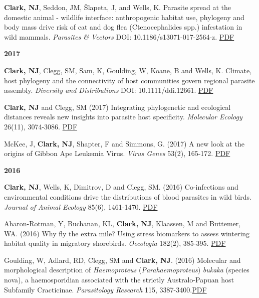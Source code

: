 \documentclass[]{article}
\begin{document}
\textbf{Clark, NJ}, Seddon, JM, Šlapeta, J, and Wells, K. Parasite
spread at the domestic animal - wildlife interface: anthropogenic
habitat use, phylogeny and body mass drive risk of cat and dog flea
(Ctenocephalides spp.) infestation in wild mammals. \emph{Parasites \&
Vectors} DOI: 10.1186/s13071-017-2564-z.
\href{http://nicholasjclark.weebly.com/uploads/4/4/9/4/44946407/clark_etal_2018parvec.pdf}{PDF}

\textbf{2017}

\textbf{Clark, NJ}, Clegg, SM, Sam, K, Goulding, W, Koane, B and Wells,
K. Climate, host phylogeny and the connectivity of host communities
govern regional parasite assembly. \emph{Diversity and Distributions}
DOI: 10.1111/ddi.12661.
\href{http://nicholasjclark.weebly.com/uploads/4/4/9/4/44946407/clark_et_al-2017-diversity_and_distributions.pdf}{PDF}

\textbf{Clark, NJ} and Clegg, SM (2017) Integrating phylogenetic and
ecological distances reveals new insights into parasite host
specificity. \emph{Molecular Ecology} 26(11), 3074-3086.
\href{http://nicholasjclark.weebly.com/uploads/4/4/9/4/44946407/clark_and_clegg-2017-molecular_ecology.pdf}{PDF}

McKee, J, \textbf{Clark, NJ}, Shapter, F and Simmons, G. (2017) A new
look at the origins of Gibbon Ape Leukemia Virus. \emph{Virus Genes}
53(2), 165-172.
\href{http://nicholasjclark.weebly.com/uploads/4/4/9/4/44946407/mckee_et_al._2017_virus_genes.pdf}{PDF}

\textbf{2016}

\textbf{Clark, NJ}, Wells, K, Dimitrov, D and Clegg, SM. (2016)
Co-infections and environmental conditions drive the distributions of
blood parasites in wild birds. \emph{Journal of Animal Ecology} 85(6),
1461-1470.
\href{http://nicholasjclark.weebly.com/uploads/4/4/9/4/44946407/clark_et_al-2016-journal_of_animal_ecology.pdf}{PDF}

Aharon-Rotman, Y, Buchanan, KL, \textbf{Clark, NJ}, Klaassen, M and
Buttemer, WA. (2016) Why fly the extra mile? Using stress biomarkers to
assess wintering habitat quality in migratory shorebirds.
\emph{Oecologia} 182(2), 385-395.
\href{http://nicholasjclark.weebly.com/uploads/4/4/9/4/44946407/aharon-rotmanetal.2016whyflyextramile.pdf}{PDF}

Goulding, W, Adlard, RD, Clegg, SM and \textbf{Clark, NJ}. (2016)
Molecular and morphological description of \emph{Haemoproteus}
(\emph{Parahaemoproteus}) \emph{bukaka} (species nova), a haemosporidian
associated with the strictly Australo-Papuan host Subfamily Cracticinae.
\emph{Parasitology Research} 115,
3387-3400.\href{http://nicholasjclark.weebly.com/uploads/4/4/9/4/44946407/goulding_et_al_parasres2016.pdf}{PDF}
\end{document}
